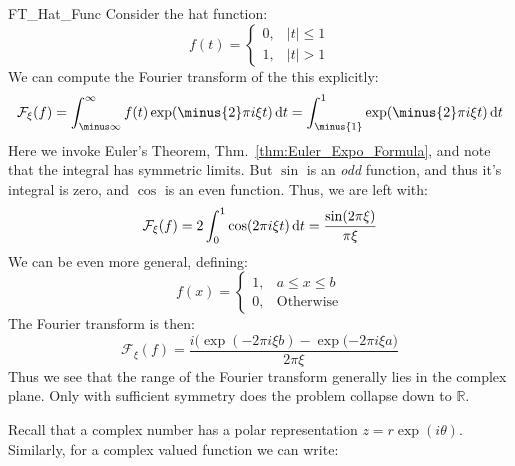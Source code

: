     \begin{lexample}{}{FT_Hat_Func}
        Consider the hat function:
        \begin{equation}
            f(t)=
            \begin{cases}
                0,&|t|\leq{1}\\
                1,&|t|>1
            \end{cases}
        \end{equation}
        We can compute the Fourier transform of the this
        explicitly:
        \begin{equation}
            \mathcal{F}_{\xi}(f)
            =\int_{\minus\infty}^{\infty}f(t)
                \exp(\minus{2}\pi{i}\xi{t})\diff{t}
            =\int_{\minus{1}}^{1}
                \exp(\minus{2}\pi{i}\xi{t})\diff{t}
        \end{equation}
        Here we invoke Euler's Theorem,
        Thm.~\ref{thm:Euler_Expo_Formula},
        and note that the integral has symmetric limits.
        But $\sin$ is an \textit{odd} function, and thus
        it's integral is zero, and $\cos$ is an even
        function. Thus, we are left with:
        \begin{equation}
            \mathcal{F}_{\xi}(f)=
            2\int_{0}^{1}\cos(2\pi{i}\xi{t})\mathop{}\!\mathrm{d}{t}
            =\frac{\sin(2\pi\xi)}{\pi\xi}
        \end{equation}
        We can be even more general, defining:
        \begin{equation}
            f(x)=
            \begin{cases}
                1,&a\leq{x}\leq{b}\\
                0,&\textrm{Otherwise}
            \end{cases}
        \end{equation}
        The Fourier transform is then:
        \begin{equation}
            \mathcal{F}_{\xi}(f)=
            \frac{i\big(\exp(\minus{2}\pi{i}\xi{b})-
                    \exp(\minus{2}\pi{i}\xi{a}\big)}{2\pi\xi}
        \end{equation}
        Thus we see that the range of the Fourier transform
        generally lies in the complex plane. Only with
        sufficient symmetry does the problem collapse down
        to $\mathbb{R}$.
    \end{lexample}
    Recall that a complex number has a polar representation
    $z=r\exp(i\theta)$. Similarly, for a complex valued
    function we can write:
